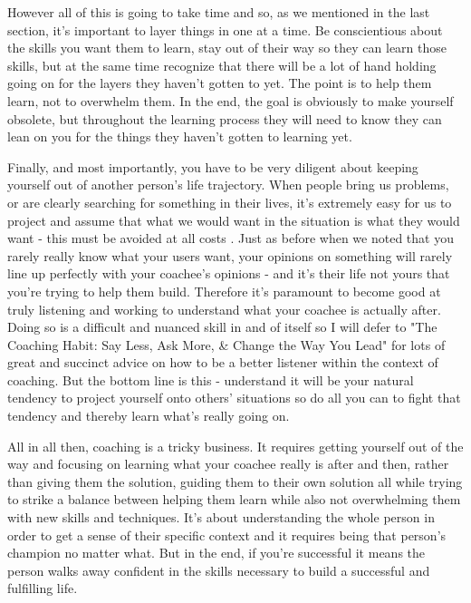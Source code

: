 \documentclass[11pt]{book}
\begin{document}
However all of this is going to take time and so, as we mentioned in the last section, it's important to layer things in one at a time. Be conscientious about the skills you want them to learn, stay out of their way so they can learn those skills, but at the same time recognize that there will be a lot of hand holding going on for the layers they haven't gotten to yet. The point is to help them learn, not to overwhelm them. In the end, the goal is obviously to make yourself obsolete, but throughout the learning process they will need to know they can lean on you for the things they haven't gotten to learning yet.
\newline

Finally, and most importantly, you have to be very diligent about keeping yourself out of another person's life trajectory. When people bring us problems, or are clearly searching for something in their lives, it's extremely easy for us to project and assume that what we would want in the situation is what they would want - this must be avoided at all costs \cite{stanier}. Just as before when we noted that you rarely really know what your users want, your opinions on something will rarely line up perfectly with your coachee's opinions - and it's their life not yours that you're trying to help them build. Therefore it's paramount to become good at truly listening and working to understand what your coachee is actually after. Doing so is a difficult and nuanced skill in and of itself so I will defer to "The Coaching Habit: Say Less, Ask More, \& Change the Way You Lead" \cite{stanier} for lots of great and succinct advice on how to be a better listener within the context of coaching. But the bottom line is this - understand it will be your natural tendency to project yourself onto others' situations so do all you can to fight that tendency and thereby learn what's really going on.
\newline

All in all then, coaching is a tricky business. It requires getting yourself out of the way and focusing on learning what your coachee really is after and then, rather than giving them the solution, guiding them to their own solution all while trying to strike a balance between helping them learn while also not overwhelming them with new skills and techniques. It's about understanding the whole person in order to get a sense of their specific context and it requires being that person's champion no matter what. But in the end, if you're successful it means the person walks away confident in the skills necessary to build a successful and fulfilling life. 
\newline
\end{document}
